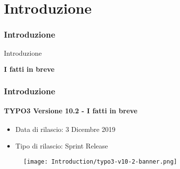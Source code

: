 %

\section{Introduzione}
\begin{frame}[fragile]
	\frametitle{Introduzione}

	\begin{center}\huge{Introduzione}\end{center}
	\begin{center}\huge{\color{typo3darkgrey}\textbf{I fatti in breve}}\end{center}

\end{frame}


\begin{frame}[fragile]
	\frametitle{Introduzione}
	\framesubtitle{TYPO3 Versione 10.2 - I fatti in breve}

	\begin{itemize}
		\item Data di rilascio: 3 Dicembre 2019
		\item Tipo di rilascio: Sprint Release
	\end{itemize}

	\begin{figure}
		\texttt{[image: Introduction/typo3-v10-2-banner.png]}
	\end{figure}

\end{frame}



